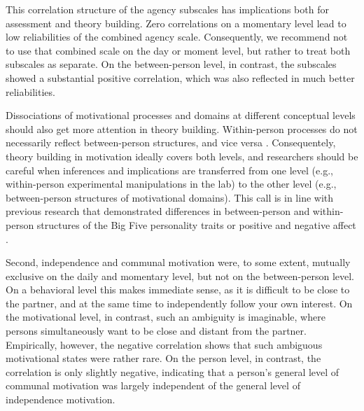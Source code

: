 \documentclass[jou,a4paper,draftfirst]{apa6}\usepackage[]{graphicx}\usepackage[]{color}
\begin{document}
This correlation structure of the agency subscales has implications both for assessment and theory building. Zero correlations on a momentary level lead to low reliabilities of the combined agency scale. Consequently, we recommend not to use that combined scale on the day or moment level, but rather to treat both subscales as separate. On the between-person level, in contrast, the subscales showed a substantial positive correlation, which was also reflected in much better reliabilities. 

Dissociations of motivational processes and domains at different conceptual levels should also get more attention in theory building. Within-person processes do not necessarily reflect between-person structures, and vice versa \parencite{molenaar_implications_2008}. Consequentely, theory building in motivation ideally covers both levels, and researchers should be careful when inferences and implications are transferred from one level (e.g., within-person experimental manipulations in the lab) to the other level (e.g., between-person structures of motivational domains). This call is in line with previous research that demonstrated differences in between-person and within-person structures of the Big Five personality traits \parencite[e.g.,][]{borkenau_BigFiveStates_1998,grice_BridgingIdiographicNomotheticDivide_2006} or positive and negative affect \parencite[e.g.,][]{brose_DifferencesBetweenPersonWithinPerson_2015}.

Second, independence and communal motivation were, to some extent, mutually exclusive on the daily and momentary level, but not on the between-person level. On a behavioral level this makes immediate sense, as it is difficult to be close to the partner, and at the same time to independently follow your own interest. On the motivational level, in contrast, such an ambiguity is imaginable, where persons simultaneously want to be close and distant from the partner. Empirically, however, the negative correlation shows that such ambiguous motivational states were rather rare. On the person level, in contrast, the correlation is only slightly negative, indicating that a person's general level of communal motivation was largely independent of the general level of independence motivation.
\end{document}
